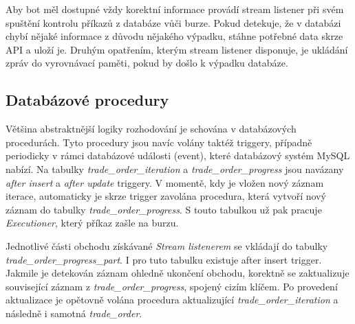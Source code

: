 Aby bot měl dostupné vždy korektní informace provádí stream listener při svém spuštění kontrolu příkazů z databáze vůči burze. Pokud detekuje, že v databázi chybí nějaké informace z důvodu nějakého výpadku,
stáhne potřebné data skrze API a uloží je. Druhým opatřením, kterým stream listener disponuje, je ukládání zpráv do vyrovnávací paměti, pokud by došlo k výpadku databáze.


\subsection{Databázové procedury}
Většina abstraktnější logiky rozhodování je schována v databázových procedurách. Tyto procedury jsou navíc volány taktéž triggery, případně periodicky v rámci databázové události (event), které
databázový systém MySQL nabízí. Na tabulky \emph{trade\_order\_iteration} a \emph{trade\_order\_progress} jsou navázany \emph{after insert} a \emph{after update} triggery. V momentě, kdy je vložen
nový záznam iterace, automaticky je skrze trigger zavolána procedura, která vytvoří nový záznam do tabulky \emph{trade\_order\_progress}. S touto tabulkou už pak pracuje \emph{Executioner}, který
příkaz zašle na burzu.

Jednotlivé části obchodu získávané \emph{Stream listenerem} se vkládají do tabulky \emph{trade\_order\_progress\_part}. I pro tuto tabulku existuje after insert trigger. Jakmile je detekován
záznam ohledně ukončení obchodu, korektně se zaktualizuje související záznam z \emph{trade\_order\_progress}, spojený cizím klíčem. Po provedení aktualizace je opětovně volána procedura aktualizující
\emph{trade\_order\_iteration} a následně i samotná \emph{trade\_order}.

